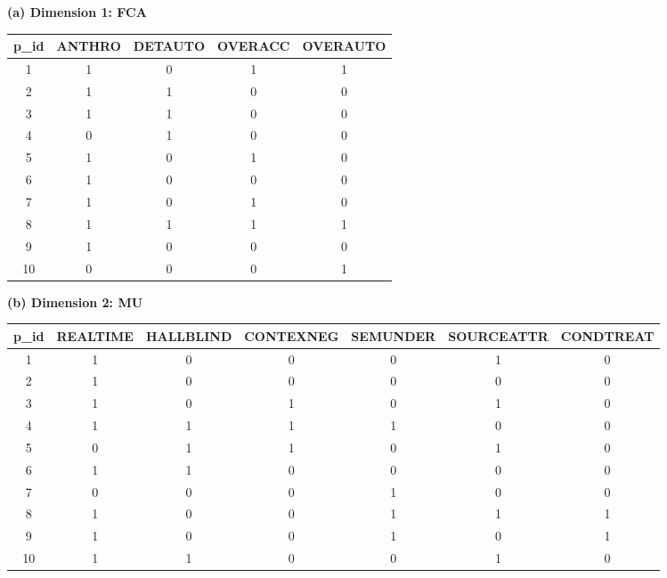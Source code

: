 \begin{table}
\centering
\setlength{\tabcolsep}{5pt}
\renewcommand{\arraystretch}{1.1}
\begin{minipage}[t]{0.36\textwidth}
\centering
\small
\textbf{(a) Dimension 1: FCA}

\vspace{0.4em}

\begin{tabular}{ccccc}
\hline
\scriptsize p\_id &
\scriptsize ANTHRO &
\scriptsize DETAUTO &
\scriptsize OVERACC &
\scriptsize OVERAUTO \\
\hline
1  & 1 & 0 & 1 & 1 \\
2  & 1 & 1 & 0 & 0 \\
3  & 1 & 1 & 0 & 0 \\
4  & 0 & 1 & 0 & 0 \\
5  & 1 & 0 & 1 & 0 \\
6  & 1 & 0 & 0 & 0 \\
7  & 1 & 0 & 1 & 0 \\
8  & 1 & 1 & 1 & 1 \\
9  & 1 & 0 & 0 & 0 \\
10 & 0 & 0 & 0 & 1 \\
\hline
\end{tabular}
\end{minipage}
\hfill
\begin{minipage}[t]{0.60\textwidth}
\centering
\scriptsize
\textbf{(b) Dimension 2: MU}

\vspace{0.4em}

\setlength{\tabcolsep}{3pt}

\begin{tabular}{ccccccc}
\hline
p\_id &
REALTIME &
HALLBLIND &
CONTEXNEG &
SEMUNDER &
SOURCEATTR &
CONDTREAT \\
\hline
1  & 1 & 0 & 0 & 0 & 1 & 0 \\
2  & 1 & 0 & 0 & 0 & 0 & 0 \\
3  & 1 & 0 & 1 & 0 & 1 & 0 \\
4  & 1 & 1 & 1 & 1 & 0 & 0 \\
5  & 0 & 1 & 1 & 0 & 1 & 0 \\
6  & 1 & 1 & 0 & 0 & 0 & 0 \\
7  & 0 & 0 & 0 & 1 & 0 & 0 \\
8  & 1 & 0 & 0 & 1 & 1 & 1 \\
9  & 1 & 0 & 0 & 1 & 0 & 1 \\
10 & 1 & 1 & 0 & 0 & 1 & 0 \\
\hline
\end{tabular}
\end{minipage}


\end{table}
